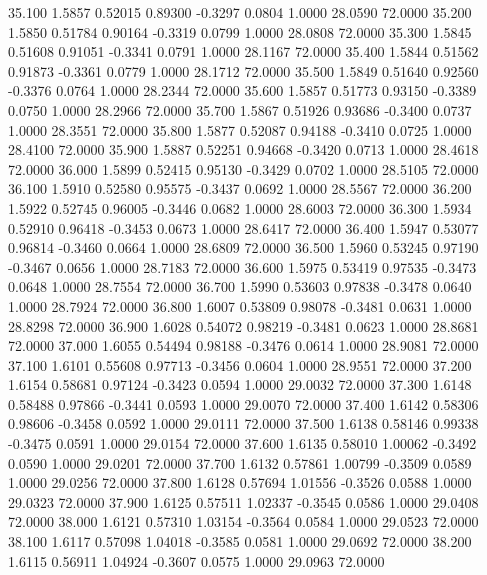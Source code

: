   35.100   1.5857   0.52015   0.89300  -0.3297   0.0804   1.0000  28.0590  72.0000
  35.200   1.5850   0.51784   0.90164  -0.3319   0.0799   1.0000  28.0808  72.0000
  35.300   1.5845   0.51608   0.91051  -0.3341   0.0791   1.0000  28.1167  72.0000
  35.400   1.5844   0.51562   0.91873  -0.3361   0.0779   1.0000  28.1712  72.0000
  35.500   1.5849   0.51640   0.92560  -0.3376   0.0764   1.0000  28.2344  72.0000
  35.600   1.5857   0.51773   0.93150  -0.3389   0.0750   1.0000  28.2966  72.0000
  35.700   1.5867   0.51926   0.93686  -0.3400   0.0737   1.0000  28.3551  72.0000
  35.800   1.5877   0.52087   0.94188  -0.3410   0.0725   1.0000  28.4100  72.0000
  35.900   1.5887   0.52251   0.94668  -0.3420   0.0713   1.0000  28.4618  72.0000
  36.000   1.5899   0.52415   0.95130  -0.3429   0.0702   1.0000  28.5105  72.0000
  36.100   1.5910   0.52580   0.95575  -0.3437   0.0692   1.0000  28.5567  72.0000
  36.200   1.5922   0.52745   0.96005  -0.3446   0.0682   1.0000  28.6003  72.0000
  36.300   1.5934   0.52910   0.96418  -0.3453   0.0673   1.0000  28.6417  72.0000
  36.400   1.5947   0.53077   0.96814  -0.3460   0.0664   1.0000  28.6809  72.0000
  36.500   1.5960   0.53245   0.97190  -0.3467   0.0656   1.0000  28.7183  72.0000
  36.600   1.5975   0.53419   0.97535  -0.3473   0.0648   1.0000  28.7554  72.0000
  36.700   1.5990   0.53603   0.97838  -0.3478   0.0640   1.0000  28.7924  72.0000
  36.800   1.6007   0.53809   0.98078  -0.3481   0.0631   1.0000  28.8298  72.0000
  36.900   1.6028   0.54072   0.98219  -0.3481   0.0623   1.0000  28.8681  72.0000
  37.000   1.6055   0.54494   0.98188  -0.3476   0.0614   1.0000  28.9081  72.0000
  37.100   1.6101   0.55608   0.97713  -0.3456   0.0604   1.0000  28.9551  72.0000
  37.200   1.6154   0.58681   0.97124  -0.3423   0.0594   1.0000  29.0032  72.0000
  37.300   1.6148   0.58488   0.97866  -0.3441   0.0593   1.0000  29.0070  72.0000
  37.400   1.6142   0.58306   0.98606  -0.3458   0.0592   1.0000  29.0111  72.0000
  37.500   1.6138   0.58146   0.99338  -0.3475   0.0591   1.0000  29.0154  72.0000
  37.600   1.6135   0.58010   1.00062  -0.3492   0.0590   1.0000  29.0201  72.0000
  37.700   1.6132   0.57861   1.00799  -0.3509   0.0589   1.0000  29.0256  72.0000
  37.800   1.6128   0.57694   1.01556  -0.3526   0.0588   1.0000  29.0323  72.0000
  37.900   1.6125   0.57511   1.02337  -0.3545   0.0586   1.0000  29.0408  72.0000
  38.000   1.6121   0.57310   1.03154  -0.3564   0.0584   1.0000  29.0523  72.0000
  38.100   1.6117   0.57098   1.04018  -0.3585   0.0581   1.0000  29.0692  72.0000
  38.200   1.6115   0.56911   1.04924  -0.3607   0.0575   1.0000  29.0963  72.0000

